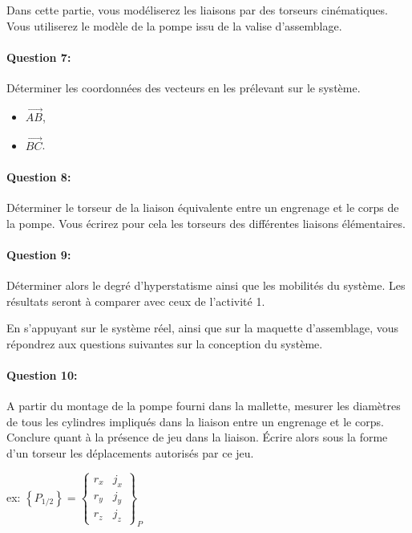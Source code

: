 \cleardoublepage


Dans cette partie, vous modéliserez les liaisons par des torseurs cinématiques. Vous utiliserez le modèle de la pompe issu de la valise d'assemblage.

\paragraph{Question 7:} Déterminer les coordonnées des vecteurs en les prélevant sur le système.
\begin{itemize}
 \item $\overrightarrow{AB}$,
 \item $\overrightarrow{BC}$.
\end{itemize}

\paragraph{Question 8:} Déterminer le torseur de la liaison équivalente entre un engrenage et le corps de la pompe. Vous écrirez pour cela les torseurs des différentes liaisons élémentaires.

\paragraph{Question 9:} Déterminer alors le degré d'hyperstatisme ainsi que les mobilités du système. Les résultats seront à comparer avec ceux de l'activité 1.

\cleardoublepage


En s'appuyant sur le système réel, ainsi que sur la maquette d'assemblage, vous répondrez aux questions suivantes sur la conception du système.

\paragraph{Question 10:} A partir du montage de la pompe fourni dans la mallette, mesurer les diamètres de tous les cylindres impliqués dans la liaison entre un engrenage et le corps. Conclure quant à la présence de jeu dans la liaison. Écrire alors sous la forme d'un torseur les déplacements autorisés par ce jeu.

ex:
$\left\{P_{1/2}\right\}=\left\{ \begin{array}{cc} r_x & j_x \\ r_y & j_y \\ r_z & j_z \end{array}\right\}_{P}$

